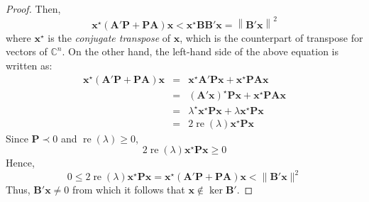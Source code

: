 \documentclass[a4paper,10pt,oneside]{book}
\begin{document}
\begin{proof}
Then,
\begin{equation}
 \mathbf{x}^\star(\mathbf{A}'\mathbf{P}+\mathbf{PA})\mathbf{x} < \mathbf{x}^\star\mathbf{BB}'\mathbf{x}=\left\| \mathbf{B}'\mathbf{x} \right\|^2
\end{equation}
where $\mathbf{x}^\star$ is the \emph{conjugate transpose} of $\mathbf{x}$, which is the counterpart of transpose for 
vectors of $\mathbb{C}^n$. On the other hand, the left-hand side of the above equation is written as:
\begin{eqnarray}
 \mathbf{x}^\star(\mathbf{A}'\mathbf{P}+\mathbf{PA})\mathbf{x} 
  &=& 	\mathbf{x}^\star\mathbf{A}'\mathbf{Px}+\mathbf{x}^\star\mathbf{PAx}\\
  &=&	(\mathbf{A}'\mathbf{x})^\star\mathbf{Px}+\mathbf{x}^\star\mathbf{PAx}\\
  &=&   \lambda^\star\mathbf{x}^\star\mathbf{Px}+\lambda\mathbf{x}^\star\mathbf{Px}\\
  &=&	2\operatorname{re}(\lambda)\mathbf{x}^\star\mathbf{Px}
\end{eqnarray}
Since $\mathbf{P}\prec 0$ and $\operatorname{re}(\lambda)\geq 0$, 
\begin{equation}
 2\operatorname{re}(\lambda)\mathbf{x}^\star\mathbf{Px} \geq 0
\end{equation}
Hence,
\begin{equation}
 0\leq  2\operatorname{re}(\lambda)\mathbf{x}^\star\mathbf{Px} = 
\mathbf{x}^\star(\mathbf{A}'\mathbf{P}+\mathbf{PA})\mathbf{x} < \|\mathbf{B}'\mathbf{x}\|^2
\end{equation}
Thus, $\mathbf{B}'\mathbf{x}\neq 0$ from which it follows that $\mathbf{x}\notin \operatorname{ker}\mathbf{B}'$.
\end{proof}
\end{document}
